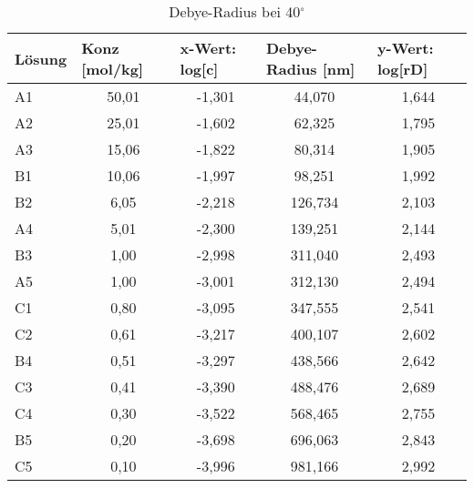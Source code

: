 \begin{table}[H]
  \centering
  \caption{Debye-Radius bei 40$^\circ$}
    \begin{tabular}{lcccc}
    \toprule
    \textbf{Lösung} & \multicolumn{1}{l}{\textbf{Konz [mol/kg]}} & \multicolumn{1}{l}{\textbf{x-Wert: log[c]}} & \multicolumn{1}{l}{\textbf{Debye-Radius [nm] }} & \multicolumn{1}{l}{\textbf{y-Wert: log[rD]}} \\
    \midrule   
    A1    & 50,01 & -1,301 & 44,070 & 1,644 \\
    A2    & 25,01 & -1,602 & 62,325 & 1,795 \\
    A3    & 15,06 & -1,822 & 80,314 & 1,905 \\
    B1    & 10,06 & -1,997 & 98,251 & 1,992 \\
    B2    & 6,05  & -2,218 & 126,734 & 2,103 \\
    A4    & 5,01  & -2,300 & 139,251 & 2,144 \\
    B3    & 1,00  & -2,998 & 311,040 & 2,493 \\
    A5    & 1,00  & -3,001 & 312,130 & 2,494 \\
    C1    & 0,80  & -3,095 & 347,555 & 2,541 \\
    C2    & 0,61  & -3,217 & 400,107 & 2,602 \\
    B4    & 0,51  & -3,297 & 438,566 & 2,642 \\
    C3    & 0,41  & -3,390 & 488,476 & 2,689 \\
    C4    & 0,30  & -3,522 & 568,465 & 2,755 \\
    B5    & 0,20  & -3,698 & 696,063 & 2,843 \\
    C5    & 0,10  & -3,996 & 981,166 & 2,992 \\
    \bottomrule
    \end{tabular}%
  \label{tab:addlabel}%
\end{table}%

